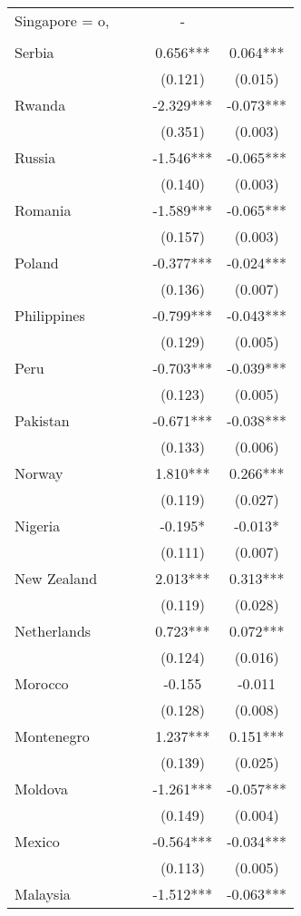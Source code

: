 \documentclass[]{article}
\begin{document}
\begin{tabular}{lcccc}
Singapore = o, &  &  & - &  \\
 &  &  &  &  \\
Serbia &  &  & 0.656*** & 0.064*** \\
 &  &  & (0.121) & (0.015) \\
Rwanda &  &  & -2.329*** & -0.073*** \\
 &  &  & (0.351) & (0.003) \\
Russia &  &  & -1.546*** & -0.065*** \\
 &  &  & (0.140) & (0.003) \\
Romania &  &  & -1.589*** & -0.065*** \\
 &  &  & (0.157) & (0.003) \\
Poland &  &  & -0.377*** & -0.024*** \\
 &  &  & (0.136) & (0.007) \\
Philippines &  &  & -0.799*** & -0.043*** \\
 &  &  & (0.129) & (0.005) \\
Peru &  &  & -0.703*** & -0.039*** \\
 &  &  & (0.123) & (0.005) \\
Pakistan &  &  & -0.671*** & -0.038*** \\
 &  &  & (0.133) & (0.006) \\
Norway &  &  & 1.810*** & 0.266*** \\
 &  &  & (0.119) & (0.027) \\
Nigeria &  &  & -0.195* & -0.013* \\
 &  &  & (0.111) & (0.007) \\
New Zealand &  &  & 2.013*** & 0.313*** \\
 &  &  & (0.119) & (0.028) \\
Netherlands &  &  & 0.723*** & 0.072*** \\
 &  &  & (0.124) & (0.016) \\
Morocco &  &  & -0.155 & -0.011 \\
 &  &  & (0.128) & (0.008) \\
Montenegro &  &  & 1.237*** & 0.151*** \\
 &  &  & (0.139) & (0.025) \\
Moldova &  &  & -1.261*** & -0.057*** \\
 &  &  & (0.149) & (0.004) \\
Mexico &  &  & -0.564*** & -0.034*** \\
 &  &  & (0.113) & (0.005) \\
Malaysia &  &  & -1.512*** & -0.063*** \\

\end{tabular}
\end{document}
